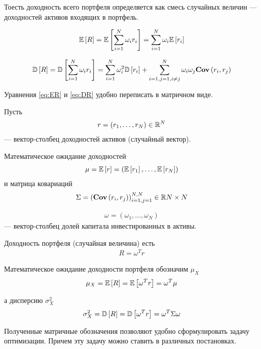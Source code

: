 Тоесть доходность всего портфеля определяется как смесь случайных величин --- доходностей активов
входящих в портфель.

\begin{multline} \label{eq:ER}
	\mathbb{E}\left[R\right] = \mathbb{E}\left[\sum_{i=1}^{N} \omega_i r_i\right] 
	= \sum_{i=1}^{N} \omega_i \mathbb{E}\left[r_i\right]
\end{multline}

\begin{multline} \label{eq:DR}
	\mathbb{D}\left[R\right] = \mathbb{D}\left[\sum_{i=1}^{N} \omega_i r_i\right] 
	= \sum_{i=1}^{N} \omega_i^2 \mathbb{D}\left[r_i\right] 
	+ \sum_{i=1, j=1, i \ne j}^{N} \omega_i \omega_j \textbf{Cov}\left(r_i, r_j\right)
\end{multline}

Уравнения \ref{eq:ER} и \ref{eq:DR} удобно переписать в матричном виде. 

Пусть 
\begin{align}
	r = (r_1, \dots, r_N) \in \mathbb{R}^N
\end{align}
--- вектор-столбец доходностей активов (случайный вектор).

Математическое ожидание доходностей
\begin{align}
	\mu = \mathbb{E}\left[r\right] = \left(\mathbb{E}\left[r_1\right], \dots, \mathbb{E}\left[r_N\right]\right)	
\end{align}
и матрица ковариаций
\begin{align}
	\Sigma = \left(\textbf{Cov}\left(r_i, r_j\right)\right)_{i=1, j=1}^{N, N} \in \mathbb{R}{N \times N}
\end{align}

\begin{align}
	\omega = \left(\omega_1, \dots, \omega_N \right)
\end{align}
--- вектор-столбец долей капитала инвестированных в активы.

Доходность портфеля (случайная величина) есть
\begin{align}
	R = \omega^T r
\end{align}

Математическое ожидание доходности портфеля обозначим $\mu_X$
\begin{align}
	\mu_X = \mathbb{E}\left[R\right] = \mathbb{E}\left[\omega^T r\right] = \omega^T \mu
\end{align}

а дисперсию $\sigma_X^2$
\begin{align}
	\sigma_X^2 = \mathbb{D}\left[R\right] = \mathbb{D}\left[\omega^T r\right] = \omega^T \Sigma \omega
\end{align}

Полученные матричные обозначения позволяют удобно сформулировать задачу оптимизации.
Причем эту задачу можно ставить в различных постановках.

